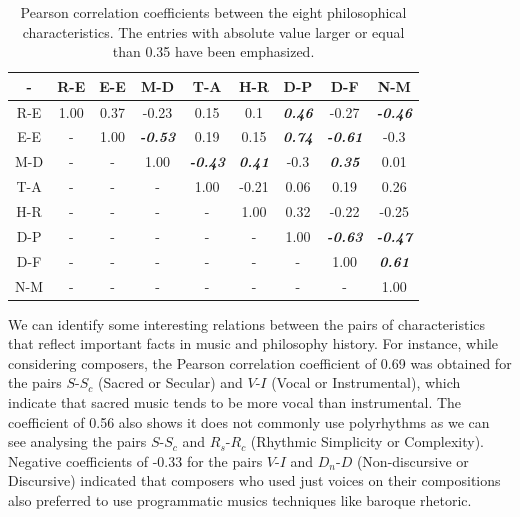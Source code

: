 \documentclass[
 aip,
 jmp,
 amsmath,amssymb,
 reprint,
]{revtex4-1}
\begin{document}
\begin{table}\footnotesize%
\caption{\label{tab:tableBphi}Pearson correlation coefficients between the eight philosophical characteristics.  The entries with absolute
value larger or equal than 0.35 have been emphasized.}

\begin{ruledtabular}
\begin{tabular}{|c||c|c|c|c|c|c|c|c|}

- & R-E & E-E & M-D & T-A & H-R & D-P & D-F & N-M \\ \hline
R-E & 1.00 & 0.37 & -0.23 & 0.15 & 0.1 & {\bf \emph{  0.46}} & -0.27 & {\bf \emph{  -0.46}} \\
E-E & -    & 1.00 & {\bf \emph{  -0.53}} & 0.19 & 0.15 & {\bf \emph{  0.74}} & {\bf \emph{  -0.61}} & -0.3 \\
M-D & -    & -    & 1.00 & {\bf \emph{-0.43}} & {\bf \emph{  0.41}} & -0.3 & {\bf \emph{  0.35}} & 0.01 \\
T-A & -    & -    & -    & 1.00 & -0.21 & 0.06  & 0.19 & 0.26 \\
H-R & -    & -    & -    & -    & 1.00 & 0.32 & -0.22 & -0.25 \\ 
D-P & -    & -    & -    & -    & -    & 1.00 & {\bf \emph{  -0.63}}  & {\bf \emph{  -0.47}} \\
D-F & -    & -    & -    & -    & -    & -    & 1.00 & {\bf \emph{  0.61}} \\
N-M & -    & -    & -    & -    & -    & -    & -    & 1.00 \\

\end{tabular}
\end{ruledtabular}
\end{table}

We can identify some interesting relations between the pairs of
characteristics that reflect important facts in music and philosophy history. For
instance, while considering composers, the Pearson correlation coefficient of 0.69 was obtained for
the pairs $S$-$S_c$ (Sacred or Secular) and $V$-$I$ (Vocal or Instrumental),
which indicate that sacred music tends to be more vocal than
instrumental. The coefficient of 0.56 also shows it does not commonly use polyrhythms as we can see
analysing the pairs $S$-$S_c$ and $R_s$-$R_c$ (Rhythmic Simplicity or Complexity). Negative coefficients of -0.33 for the pairs $V$-$I$ and $D_n$-$D$
(Non-discursive or Discursive) indicated that composers who used
just voices on their compositions also preferred to use programmatic
musics techniques like baroque rhetoric.
\end{document}
